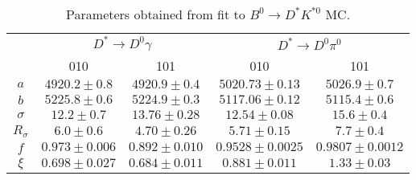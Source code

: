 \begin{table}
  \centering
  \begin{tabular}{ccccc}
      \toprule
      & \multicolumn{2}{c}{$D^* \to D^0\gamma$} & \multicolumn{2}{c}{$D^* \to D^0\pi^0$} \\
      & 010 & 101 & 010 & 101 \\
      \midrule
$a$ & $4920.2 \pm 0.8$ & $4920.9 \pm 0.4$ & $5020.73 \pm 0.13$ & $5026.9 \pm 0.7$ \\
$b$ & $5225.8 \pm 0.6$ & $5224.9 \pm 0.3$ & $5117.06 \pm 0.12$ & $5115.4 \pm 0.6$ \\
$\sigma$ & $12.2 \pm 0.7$ & $13.76 \pm 0.28$ & $12.54 \pm 0.08$ & $15.6 \pm 0.4$ \\
$R_\sigma$ & $6.0 \pm 0.6$ & $4.70 \pm 0.26$ & $5.71 \pm 0.15$ & $7.7 \pm 0.4$ \\
$f$ & $0.973 \pm 0.006$ & $0.892 \pm 0.010$ & $0.9528 \pm 0.0025$ & $0.9807 \pm 0.0012$ \\
$\xi$ & $0.698 \pm 0.027$ & $0.684 \pm 0.011$ & $0.881 \pm 0.011$ & $1.33 \pm 0.03$ \\
      \bottomrule
  \end{tabular}
  \caption{Parameters obtained from fit to $B^0 \to D^*K^{*0}$ MC.}
\label{tab:part_reco_parameters}
\end{table}

